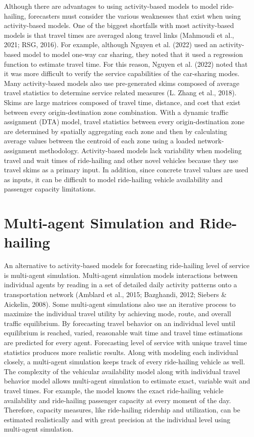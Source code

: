 \documentclass[simple, masters, twoside]{byuthesis}
\begin{document}
Although there are advantages to using activity-based models to model ride-hailing, forecasters must consider the various weaknesses that exist when using activity-based models. One of the biggest shortfalls with most activity-based models is that travel times are averaged along travel links (Mahmoudi et al., 2021; RSG, 2016). For example, although Nguyen et al. (2022) used an activity-based model to model one-way car sharing, they noted that it used a regression function to estimate travel time. For this reason, Nguyen et al. (2022) noted that it was more difficult to verify the service capabilities of the car-sharing modes. Many activity-based models also use pre-generated skims composed of average travel statistics to determine service related measures (L. Zhang et al., 2018). Skims are large matrices composed of travel time, distance, and cost that exist between every origin-destination zone combination. With a dynamic traffic assignment (DTA) model, travel statistics between every origin-destination zone are determined by spatially aggregating each zone and then by calculating average values between the centroid of each zone using a loaded network-assignment methodology. Activity-based models lack variability when modeling travel and wait times of ride-hailing and other novel vehicles because they use travel skims as a primary input. In addition, since concrete travel values are used as inputs, it can be difficult to model ride-hailing vehicle availability and passenger capacity limitations.

\hypertarget{lit-mas}{%
\section{Multi-agent Simulation and Ride-hailing}\label{lit-mas}}

An alternative to activity-based models for forecasting ride-hailing level of service is multi-agent simulation. Multi-agent simulation models interactions between individual agents by reading in a set of detailed daily activity patterns onto a transportation network (Amblard et al., 2015; Bazghandi, 2012; Siebers \& Aickelin, 2008). Some multi-agent simulations also use an iterative process to maximize the individual travel utility by achieving mode, route, and overall traffic equilibrium. By forecasting travel behavior on an individual level until equilibrium is reached, varied, reasonable wait time and travel time estimations are predicted for every agent. Forecasting level of service with unique travel time statistics produces more realistic results. Along with modeling each individual closely, a multi-agent simulation keeps track of every ride-hailing vehicle as well. The complexity of the vehicular availability model along with individual travel behavior model allows multi-agent simulation to estimate exact, variable wait and travel times. For example, the model knows the exact ride-hailing vehicle availability and ride-hailing passenger capacity at every moment of the day. Therefore, capacity measures, like ride-hailing ridership and utilization, can be estimated realistically and with great precision at the individual level using multi-agent simulation.
\end{document}
